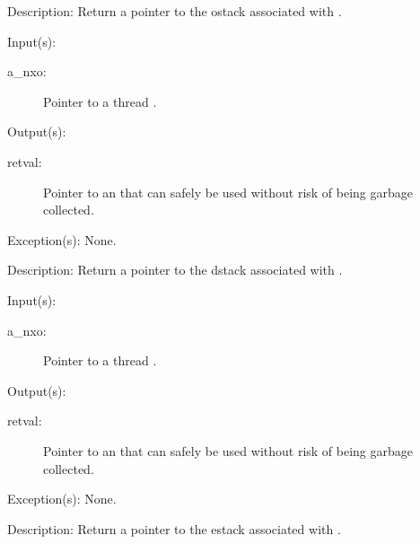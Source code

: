 \begin{capi}
\begin{capilist}
	\item[Description: ]
		Return a pointer to the ostack associated with .
	\end{capilist}
\label{nxo_thread_dstack_get}
	\begin{capilist}
	\item[Input(s): ]
		\begin{description}\item[]
		\item[a\_nxo: ]
			Pointer to a thread .
		\end{description}
	\item[Output(s): ]
		\begin{description}\item[]
		\item[retval: ]
			Pointer to an  that can safely be used
			without risk of being garbage collected.
		\end{description}
	\item[Exception(s): ] None.
	\item[Description: ]
		Return a pointer to the dstack associated with .
	\end{capilist}
\label{nxo_thread_estack_get}
	\begin{capilist}
	\item[Input(s): ]
		\begin{description}\item[]
		\item[a\_nxo: ]
			Pointer to a thread \classname{nxo}.
		\end{description}
	\item[Output(s): ]
		\begin{description}\item[]
		\item[retval: ]
			Pointer to an  that can safely be used
			without risk of being garbage collected.
		\end{description}
	\item[Exception(s): ] None.
	\item[Description: ]
		Return a pointer to the estack associated with \cvar{a\_nxo}.
	\end{capilist}
\label{nxo_thread_istack_get}

\end{capi}
